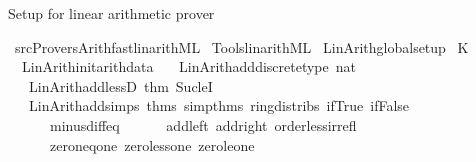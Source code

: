 \begin{isabellebody}
\begin{isamarkuptext}
Setup for linear arithmetic prover%
\end{isamarkuptext}\isamarkuptrue%
%
\isadelimML
%
\endisadelimML
%
\isatagML
{}\isamarkupfalse%
\ {\isacartoucheopen}{\isachartilde}{\kern0pt}{\isachartilde}{\kern0pt}{\isacharslash}{\kern0pt}src{\isacharslash}{\kern0pt}Provers{\isacharslash}{\kern0pt}Arith{\isacharslash}{\kern0pt}fast{\isacharunderscore}{\kern0pt}lin{\isacharunderscore}{\kern0pt}arith{\isachardot}{\kern0pt}ML{\isacartoucheclose}\isanewline
{}\isamarkupfalse%
\ {\isacartoucheopen}Tools{\isacharslash}{\kern0pt}lin{\isacharunderscore}{\kern0pt}arith{\isachardot}{\kern0pt}ML{\isacartoucheclose}\isanewline
{}\isamarkupfalse%
\ {\isacartoucheopen}Lin{\isacharunderscore}{\kern0pt}Arith{\isachardot}{\kern0pt}global{\isacharunderscore}{\kern0pt}setup{\isacartoucheclose}\isanewline
{}\isamarkupfalse%
\ {\isacartoucheopen}K\ {\isacharparenleft}{\kern0pt}\isanewline
\ \ Lin{\isacharunderscore}{\kern0pt}Arith{\isachardot}{\kern0pt}init{\isacharunderscore}{\kern0pt}arith{\isacharunderscore}{\kern0pt}data\isanewline
\ \ {\isacharhash}{\kern0pt}{\isachargreater}{\kern0pt}\ Lin{\isacharunderscore}{\kern0pt}Arith{\isachardot}{\kern0pt}add{\isacharunderscore}{\kern0pt}discrete{\isacharunderscore}{\kern0pt}type\ \isactrltypeUNDERSCOREname {\isasymopen}nat{\isasymclose}\isanewline
\ \ {\isacharhash}{\kern0pt}{\isachargreater}{\kern0pt}\ Lin{\isacharunderscore}{\kern0pt}Arith{\isachardot}{\kern0pt}add{\isacharunderscore}{\kern0pt}lessD\ {\isacharat}{\kern0pt}{\isacharbraceleft}{\kern0pt}thm\ Suc{\isacharunderscore}{\kern0pt}leI{\isacharbraceright}{\kern0pt}\isanewline
\ \ {\isacharhash}{\kern0pt}{\isachargreater}{\kern0pt}\ Lin{\isacharunderscore}{\kern0pt}Arith{\isachardot}{\kern0pt}add{\isacharunderscore}{\kern0pt}simps\ {\isacharat}{\kern0pt}{\isacharbraceleft}{\kern0pt}thms\ simp{\isacharunderscore}{\kern0pt}thms\ ring{\isacharunderscore}{\kern0pt}distribs\ if{\isacharunderscore}{\kern0pt}True\ if{\isacharunderscore}{\kern0pt}False\isanewline
\ \ \ \ \ \ minus{\isacharunderscore}{\kern0pt}diff{\isacharunderscore}{\kern0pt}eq\isanewline
\ \ \ \ \ \ add{\isacharunderscore}{\kern0pt}{}{\isacharunderscore}{\kern0pt}left\ add{\isacharunderscore}{\kern0pt}{}{\isacharunderscore}{\kern0pt}right\ order{\isacharunderscore}{\kern0pt}less{\isacharunderscore}{\kern0pt}irrefl\isanewline
\ \ \ \ \ \ zero{\isacharunderscore}{\kern0pt}neq{\isacharunderscore}{\kern0pt}one\ zero{\isacharunderscore}{\kern0pt}less{\isacharunderscore}{\kern0pt}one\ zero{\isacharunderscore}{\kern0pt}le{\isacharunderscore}{\kern0pt}one\isanewline

\end{isabellebody}
